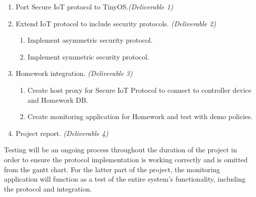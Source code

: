 \documentclass{mprop}
\begin{document}
\begin{enumerate}
  \item Port Secure IoT protocol to TinyOS.\footnotesize{\textit{(Deliverable 1)}}
  \item Extend IoT protocol to include security protocols. \footnotesize{\textit{(Deliverable 2)}}
  \begin{enumerate}
    \item Implement asymmetric security protocol.
    \item Implement symmetric security protocol.
  \end{enumerate}
  \item Homework integration. \footnotesize{\textit{(Deliverable 3)}}
  \begin{enumerate}
    \item Create host proxy for Secure IoT Protocol to connect to controller device and Homework DB.
    \item Create monitoring application for Homework and test with demo policies.
  \end{enumerate}
  \item Project report. \footnotesize{\textit{(Deliverable 4)}}
\end{enumerate}

Testing will be an ongoing process throughout the duration of the project in order to ensure the protocol implementation is working correctly and is omitted from the gantt chart. For the latter part of the project, the monitoring application will function as a test of the entire system's functionality, including the protocol and integration.

\end{document}
